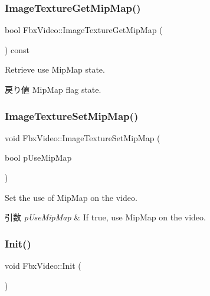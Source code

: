 \subsubsection{\texorpdfstring{Image\+Texture\+Get\+Mip\+Map()}{ImageTextureGetMipMap()}}
{\footnotesize\ttfamily bool Fbx\+Video\+::\+Image\+Texture\+Get\+Mip\+Map (\begin{DoxyParamCaption}{ }\end{DoxyParamCaption}) const}

Retrieve use Mip\+Map state. \begin{DoxyReturn}{戻り値}
Mip\+Map flag state. 
\end{DoxyReturn}
\mbox{\label{class_fbx_video_ae041331c4f831b2b55e87b4581047d74}} 
\subsubsection{\texorpdfstring{Image\+Texture\+Set\+Mip\+Map()}{ImageTextureSetMipMap()}}
{\footnotesize\ttfamily void Fbx\+Video\+::\+Image\+Texture\+Set\+Mip\+Map (\begin{DoxyParamCaption}\item[{bool}]{p\+Use\+Mip\+Map }\end{DoxyParamCaption})}

Set the use of Mip\+Map on the video. 
\begin{DoxyParams}{引数}
{\em p\+Use\+Mip\+Map} & If {\ttfamily true}, use Mip\+Map on the video. \\
\hline
\end{DoxyParams}
\mbox{\label{class_fbx_video_a7eebf649a1500d85b39a69673ef75a9c}} 
\subsubsection{\texorpdfstring{Init()}{Init()}}
{\footnotesize\ttfamily void Fbx\+Video\+::\+Init (\begin{DoxyParamCaption}{ }\end{DoxyParamCaption})\hspace{0.3cm}{\ttfamily [protected]}}

\mbox{\label{class_fbx_video_a135c575d14d2ba47c901920687f0e52c}} 
